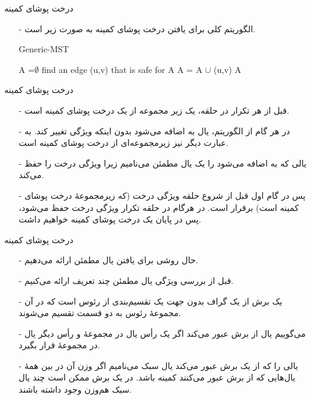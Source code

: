 \begin{frame}{‌درخت پوشای کمینه}
\begin{itemize}\itemr
\item[-]
الگوریتم کلی برای یافتن درخت پوشای کمینه به صورت زیر است.
\begin{algorithm}[H]\alglr
  \caption{Generic-MST} 
  \begin{algorithmic}[1]
   \State A =$\emptyset$
   			\State find an edge (u,v) that is safe for A
   			\State A = A $\cup$ {(u,v)}
   	\EndWhile
   	\State \Return A               
  \end{algorithmic}
  \label{alg:merge}
\end{algorithm}
\end{itemize}
\end{frame}


\begin{frame}{‌درخت پوشای کمینه}
\begin{itemize}\itemr
\item[-]
قبل از هر تکرار در حلقه،
یک زیر مجموعه از یک درخت پوشای کمینه است.
\item[-]
در هر گام از الگوریتم، یال
به
اضافه می‌شود بدون اینکه ویژگی
تغییر کند. به عبارت دیگر
نیز زیرمجموعه‌ای از درخت پوشای کمینه است.
\item[-]
یالی که به
اضافه می‌شود را یک یال مطمئن
می‌نامیم زیرا ویژگی درخت را حفظ می‌کند.
\item[-]
پس در گام اول قبل از شروع حلقه ویژگی درخت (که زیرمجموعهٔ درخت پوشای کمینه است) برقرار است. در هرگام در حلقه تکرار ویژگی درخت حفظ می‌شود، پس در پایان یک درخت پوشای کمینه خواهیم داشت.
\end{itemize}
\end{frame}


\begin{frame}{‌درخت پوشای کمینه}
\begin{itemize}\itemr
\item[-]
حال روشی برای یافتن یال مطمئن ارائه می‌‌دهیم.
\item[-]
قبل از بررسی ویژگی یال مطمئن چند تعریف ارائه می‌کنیم.
\item[-]
یک برش
از یک گراف بدون جهت
یک تقسیم‌بندی از رئوس
است که در آن مجموعهٔ رئوس به دو قسمت تقسیم می‌شوند.
\item[-]
می‌گوییم یال
از برش
عبور می‌کند
اگر یک رأس یال در مجموعهٔ
و رأس دیگر یال در مجموعهٔ
قرار بگیرد.
\item[-]
یالی را که از یک برش عبور می‌کند یال سبک
می‌نامیم اگر وزن آن در بین همهٔ یال‌هایی که از برش عبور می‌کنند کمینه باشد. در یک برش ممکن است چند یال سبک هم‌وزن وجود داشته باشند.
\end{itemize}
\end{frame}



